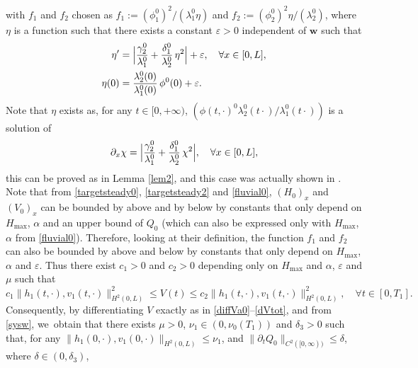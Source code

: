 with $f_{1}$ and $f_{2}$ chosen as $f_{1}:=(\phi_{1}^{0})^{2}/(\lambda_{1}^{0}\eta)$ and $f_{2}:=(\phi_{2}^{0})^{2}\eta/(\lambda_{2}^{0})$,
where $\eta$ is a function such that there exists a constant $\varepsilon>0$ independent of $\boldsymbol{w}$ such that
\begin{equation*}
\begin{split}
\eta'&=\Bigl|\frac{\gamma_{2}^{0}}{\lambda_{1}^{0}}+\frac{\delta_{1}^{0}}{\lambda_{2}^{0}}\,\eta^{2}\Bigr|+\varepsilon,\quad \forall x\in[0,L],\\
\eta(0)&=\frac{\lambda_{2}^{0}(0)}{\lambda_{1}^{0}(0)}\,\phi^{0}(0)+\varepsilon.
\end{split}
\end{equation*}
Note that $\eta$ exists as, for any $t\in[0,+\infty)$, $(\phi(t,\cdot)^{0}\lambda_{2}^{0}(t\cdot)/\lambda_{1}^{0}(t\cdot))$ is a solution of
\begin{equation*}
\partial_{x} \chi=\Bigl|\frac{\gamma_{2}^{0}}{\lambda_{1}^{0}}+\frac{\delta_{1}^{0}}{\lambda_{2}^{0}}\,\chi^{2}\Bigr|, \quad\forall x\in[0,L],
\end{equation*}
this can be proved as in Lemma \ref{lem2}, and this case was actually shown in \cite{HS}.
Note that from \eqref{targetsteady0}, \eqref{targetsteady2} and \eqref{fluvial0}, $(H_{0})_{x}$ and $(V_{0})_{x}$ can be bounded by above and by below by constants that only depend on $H_{\max}$, $\alpha$ and an upper bound of $Q_{0}$ (which can also be expressed only with $H_{\max}$, $\alpha$ from \eqref{fluvial0}). Therefore, looking at their definition, the function $f_{1}$ and $f_{2}$ can also be bounded by above and below by constants that only depend on $H_{\max}$, $\alpha$ and $\varepsilon$. Thus there exist $c_{1}>0$ and $c_{2}>0$ depending only on $H_{\max}$ and $\alpha$, $\varepsilon$ and $\mu$ such that
\begin{equation}
c_{1}\lVert h_{1}(t,\cdot),v_{1}(t,\cdot)\rVert_{H^{2}(0,L)}^{2}\leq V(t)\leq c_{2}\lVert h_{1}(t,\cdot),v_{1}(t,\cdot)\rVert_{H^{2}(0,L)}^{2},\quad\forall t\in[0,T_{1}].
\label{equiv2}
\end{equation}
Consequently, by differentiating $V$ exactly as in \eqref{diffVa0}--\eqref{dVtot}, and from \eqref{sysw}, we~obtain that there exists $\mu>0$, $\nu_{1}\in(0,\nu_{0}(T_{1}))$ and ${\delta_{3}}>0$ such that, for any $\lVert h_{1}(0,\cdot),v_{1}(0,\cdot)\rVert_{H^{2}(0,L)}\leq \nu_{1}$,
and $\lVert\partial_{t}Q_{0}\rVert_{C^{2}([0,\infty))}\leq \delta$, where $\delta\in(0,\delta_{3})$,
